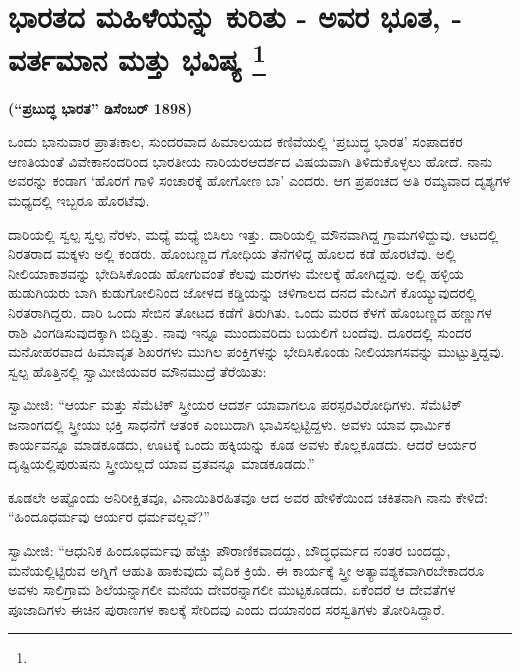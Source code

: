 
\chapter[ಭಾರತದ ಮಹಿಳೆಯನ್ನು ಕುರಿತು - ಅವರ ಭೂತ, - ವರ್ತಮಾನ ಮತ್ತು ಭವಿಷ್ಯ ]{ಭಾರತದ ಮಹಿಳೆಯನ್ನು ಕುರಿತು - ಅವರ ಭೂತ, - ವರ್ತಮಾನ ಮತ್ತು ಭವಿಷ್ಯ \protect\footnote{}}

\centerline{\textbf{(“ಪ್ರಬುದ್ಧ ಭಾರತ” ಡಿಸೆಂಬರ್​ 1898)}}

\vskip 3pt

ಒಂದು ಭಾನುವಾರ ಪ್ರಾತಃಕಾಲ, ಸುಂದರವಾದ ಹಿಮಾಲಯದ ಕಣಿವೆಯಲ್ಲಿ ‘ಪ್ರಬುದ್ಧ ಭಾರತ’ ಸಂಪಾದಕರ ಆಣತಿಯಂತೆ ವಿವೇಕಾನಂದರಿಂದ ಭಾರತೀಯ ನಾರಿಯರ\break ಆದರ್ಶದ ವಿಷಯವಾಗಿ ತಿಳಿದುಕೊಳ್ಳಲು ಹೋದೆ. ನಾನು ಅವರನ್ನು ಕಂಡಾಗ ‘ಹೊರಗೆ ಗಾಳಿ ಸಂಚಾರಕ್ಕೆ ಹೋಗೋಣ ಬಾ’ ಎಂದರು. ಆಗ ಪ್ರಪಂಚದ ಅತಿ ರಮ್ಯವಾದ ದೃಶ್ಯಗಳ ಮಧ್ಯದಲ್ಲಿ ಇಬ್ಬರೂ ಹೊರಟೆವು.

\vskip 3pt

ದಾರಿಯಲ್ಲಿ ಸ್ವಲ್ಪ ಸ್ವಲ್ಪ ನೆರಳು, ಮಧ್ಯೆ ಮಧ್ಯೆ ಬಿಸಿಲು ಇತ್ತು. ದಾರಿಯಲ್ಲಿ ಮೌನವಾಗಿದ್ದ ಗ್ರಾಮಗಳಿದ್ದುವು. ಆಟದಲ್ಲಿ ನಿರತರಾದ ಮಕ್ಕಳು ಅಲ್ಲಿ ಕಂಡರು. ಹೊಂಬಣ್ಣದ ಗೋಧಿಯ ತೆನೆಗಳಿದ್ದ ಹೊಲದ ಕಡೆ ಹೊರಟೆವು. ಅಲ್ಲಿ ನೀಲಿಯಾಕಾಶವನ್ನು ಭೇದಿಸಿಕೊಂಡು ಹೋಗುವಂತೆ ಕೆಲವು ಮರಗಳು ಮೇಲಕ್ಕೆ ಹೋಗಿದ್ದವು. ಅಲ್ಲಿ ಹಳ್ಳಿಯ ಹುಡುಗಿಯರು ಬಾಗಿ ಕುಡುಗೋಲಿನಿಂದ ಜೋಳದ ಕಡ್ಡಿಯನ್ನು ಚಳಿಗಾಲದ ದನದ ಮೇವಿಗೆ ಕೊಯ್ಯುವುದರಲ್ಲಿ ನಿರತರಾಗಿದ್ದರು. ದಾರಿ ಒಂದು ಸೇಬಿನ ತೋಟದ ಕಡೆಗೆ ತಿರುಗಿತು. ಒಂದು ಮರದ ಕೆಳಗೆ ಹೊಂಬಣ್ಣದ ಹಣ್ಣುಗಳ ರಾಶಿ ವಿಂಗಡಿಸುವುದಕ್ಕಾಗಿ ಬಿದ್ದಿತ್ತು. ನಾವು ಇನ್ನೂ ಮುಂದುವರಿದು ಬಯಲಿಗೆ ಬಂದೆವು. ದೂರದಲ್ಲಿ ಸುಂದರ ಮನೋಹರವಾದ ಹಿಮಾವೃತ ಶಿಖರಗಳು ಮುಗಿಲ ಪಂಕ್ತಿಗಳನ್ನು ಭೇದಿಸಿಕೊಂಡು ನೀಲಿಯಾಗಸವನ್ನು ಮುಟ್ಟುತ್ತಿದ್ದವು. ಸ್ವಲ್ಪ ಹೊತ್ತಿನಲ್ಲಿ ಸ್ವಾಮೀಜಿಯವರ ಮೌನಮುದ್ರೆ ತೆರೆಯಿತು:

\vskip 3pt

ಸ್ವಾಮೀಜಿ: “ಆರ್ಯ ಮತ್ತು ಸೆಮೆಟಿಕ್​ ಸ್ತ್ರೀಯರ ಆದರ್ಶ ಯಾವಾಗಲೂ ಪರಸ್ಪರ\break ವಿರೋಧಿಗಳು. ಸೆಮೆಟಿಕ್​ ಜನಾಂಗದಲ್ಲಿ ಸ್ತ್ರೀಯು ಭಕ್ತಿ ಸಾಧನೆಗೆ ಆತಂಕ ಎಂಬುದಾಗಿ ಭಾವಿಸಲ್ಪಟ್ಟಿದ್ದಳು. ಅವಳು ಯಾವ ಧಾರ್ಮಿಕ ಕಾರ್ಯವನ್ನೂ ಮಾಡಕೂಡದು, ಊಟಕ್ಕೆ ಒಂದು ಹಕ್ಕಿಯನ್ನು ಕೂಡ ಅವಳು ಕೊಲ್ಲಕೂಡದು. ಆದರೆ ಆರ್ಯರ ದೃಷ್ಟಿಯಲ್ಲಿ\break ಪುರುಷನು ಸ್ತ್ರೀಯಿಲ್ಲದೆ ಯಾವ ವ್ರತವನ್ನೂ ಮಾಡಕೂಡದು.”

\vskip 3pt

ಕೂಡಲೇ ಅಷ್ಟೊಂದು ಅನಿರೀಕ್ಷಿತವೂ, ವಿನಾಯಿತಿರಹಿತವೂ ಆದ ಅವರ ಹೇಳಿಕೆಯಿಂದ ಚಕಿತನಾಗಿ ನಾನು ಕೇಳಿದೆ: “ಹಿಂದೂಧರ್ಮವು ಆರ್ಯರ ಧರ್ಮವಲ್ಲವೆ?”

\vskip 3pt

ಸ್ವಾಮೀಜಿ: “ಆಧುನಿಕ ಹಿಂದೂಧರ್ಮವು ಹೆಚ್ಚು ಪೌರಾಣಿಕವಾದದ್ದು, ಬೌದ್ಧಧರ್ಮದ ನಂತರ ಬಂದದ್ದು, ಮನೆಯಲ್ಲಿಟ್ಟಿರುವ ಅಗ್ನಿಗೆ ಆಹುತಿ ಹಾಕುವುದು ವೈದಿಕ ಕ್ರಿಯೆ. ಈ ಕಾರ್ಯಕ್ಕೆ ಸ್ತ್ರೀ ಅತ್ಯಾವಶ್ಯಕವಾಗಿರಬೇಕಾದರೂ ಅವಳು ಸಾಲಿಗ್ರಾಮ ಶಿಲೆಯನ್ನಾಗಲೀ ಮನೆಯ ದೇವರನ್ನಾಗಲೀ ಮುಟ್ಟಕೂಡದು. ಏಕೆಂದರೆ ಆ ದೇವತೆಗಳ ಪೂಜಾದಿಗಳು ಈಚಿನ ಪುರಾಣಗಳ ಕಾಲಕ್ಕೆ ಸೇರಿದವು ಎಂದು ದಯಾನಂದ ಸರಸ್ವತಿಗಳು ತೋರಿಸಿದ್ದಾರೆ.

